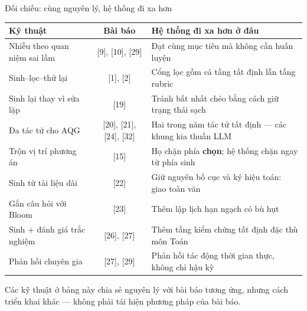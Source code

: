 \documentclass[aspectratio=169,11pt]{beamer}
\renewcommand{\cite}[1]{\textcolor{cMuted}{[#1]}}
\newcommand{\srcnote}[1]{\vfill{\scriptsize\color{cMuted}#1\par}}
\begin{document}
\begin{frame}{Đối chiếu: cùng nguyên lý, hệ thống đi xa hơn}
  \vspace{0.5em}
  \begin{center}
  \scriptsize
  \setlength{\tabcolsep}{4pt}
  \begin{tabular}{@{}l c l@{}}
    \toprule
    \textbf{Kỹ thuật} & \textbf{Bài báo} & \textbf{Hệ thống đi xa hơn ở đâu} \\
    \midrule
    Nhiễu theo quan niệm sai lầm & \cite{9}, \cite{10}, \cite{29} & Đạt cùng mục tiêu mà \alert{không cần huấn luyện} \\
    Sinh--lọc--thử lại           & \cite{1}, \cite{2} & Cổng lọc gồm cả \alert{tầng tất định} lẫn tầng rubric \\
    Sinh lại thay vì sửa lặp     & \cite{19} & Tránh bất nhất chéo bằng cách \alert{giữ trạng thái sạch} \\
    Đa tác tử cho AQG            & \cite{20}, \cite{21}, \cite{24}, \cite{32} & \alert{Hai trong năm tác tử tất định} --- các khung kia thuần LLM \\
    Trộn vị trí phương án        & \cite{15} & Họ chặn phía \textbf{chọn}; hệ thống chặn ngay từ phía \alert{sinh} \\
    Sinh từ tài liệu dài         & \cite{22} & Giữ nguyên bố cục và ký hiệu toán: giao \alert{toàn văn} \\
    Gắn câu hỏi với Bloom        & \cite{23} & Thêm \alert{lập lịch hạn ngạch có bù hụt} \\
    Sinh + đánh giá trắc nghiệm  & \cite{26}, \cite{27} & Thêm \alert{tầng kiểm chứng tất định} đặc thù môn Toán \\
    Phản hồi chuyên gia          & \cite{27}, \cite{29} & Phản hồi tác động \alert{thời gian thực}, không chỉ hậu kỳ \\
    \bottomrule
  \end{tabular}
  \end{center}
  \vfill
  \srcnote{Các kỹ thuật ở bảng này chia sẻ nguyên lý với bài báo tương ứng, nhưng cách triển khai khác --- không phải tái hiện phương pháp của bài báo.}
\end{frame}
\end{document}
